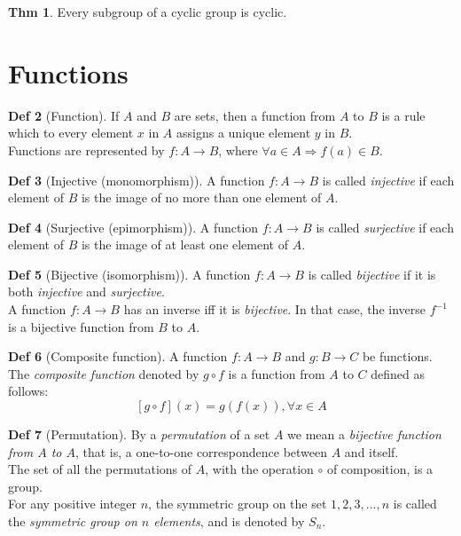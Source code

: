 \documentclass{article}
\theoremstyle{definition}
\newtheorem{definition}{Def}[section]
\newtheorem{theorem}[definition]{Thm}
\begin{document}
\begin{theorem}
    Every subgroup of a cyclic group is cyclic.
\end{theorem}

\section{Functions}
\begin{definition}[Function]
    If $A$ and $B$ are sets, then a function from $A$ to $B$ is a rule which to every element $x$ in $A$ assigns a unique element $y$ in $B$.
    \\
    Functions are represented by $f: A \rightarrow B$, where $\forall a \in A \Rightarrow f(a) \in B$.
\end{definition}

\begin{definition}[Injective (monomorphism)]
    A function $f:A \rightarrow B$ is called \emph{injective} if each element of $B$ is the image of no more than one element of $A$.
\end{definition}

\begin{definition}[Surjective (epimorphism)]
    A function $f:A \rightarrow B$ is called \emph{surjective} if each element of $B$ is the image of at least one element of $A$.
\end{definition}

\begin{definition}[Bijective (isomorphism)]
    A function $f:A \rightarrow B$ is called \emph{bijective} if it is both \emph{injective} and \emph{surjective}.
    \\
    A function $f: A \rightarrow B$ has an inverse iff it is \emph{bijective}. In that case, the inverse $f^{-1}$ is a bijective function from $B$ to $A$.
\end{definition}

\begin{definition}[Composite function]
    A function $f:A \rightarrow B$ and $g: B \rightarrow C$ be functions. The \emph{composite function} denoted by $g \circ f$ is a function from $A$ to $C$ defined as follows:
    $$[g \circ f](x) = g(f(x)),  \forall x \in A$$
\end{definition}


\begin{definition}[Permutation]
    By a \emph{permutation} of a set $A$ we mean a \emph{bijective function from $A$ to $A$}, that is, a one-to-one correspondence between $A$ and itself.
    \\
    The set of all the permutations of $A$, with the operation $\circ$ of composition, is a group.
    \\
    For any positive integer $n$, the symmetric group on the set ${1,2, 3,..., n}$ is called the \emph{symmetric group on $n$ elements}, and is denoted by $S_n$.
\end{definition}
\end{document}
